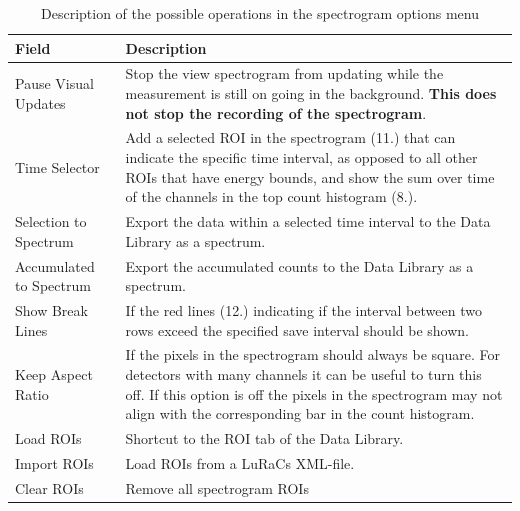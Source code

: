 \begin{table}[H]
    \centering
    \caption{Description of the possible operations in the spectrogram options menu}
    \label{tab:spectrogram_options}
    \begin{tabular}{p{}p{}}
    \toprule
    \textbf{Field} & \textbf{Description} \\ \midrule
    Pause Visual Updates & Stop the view spectrogram from updating while the measurement is still on going in the background. \textbf{This does not stop the recording of the spectrogram}. \\
    Time Selector & Add a selected ROI in the spectrogram (11.) that can indicate the specific time interval, as opposed to all other ROIs that have energy bounds, and show the sum over time of the channels in the top count histogram (8.). \\
    Selection to Spectrum & Export the data within a selected time interval to the Data Library as a spectrum. \\
    Accumulated to Spectrum & Export the accumulated counts to the Data Library as a spectrum. \\
    Show Break Lines & If the red lines (12.) indicating if the interval between two rows exceed the specified save interval should be shown. \\
    Keep Aspect Ratio & If the pixels in the spectrogram should always be square. For detectors with many channels it can be useful to turn this off. If this option is off the pixels in the spectrogram may not align with the corresponding bar in the count histogram. \\
    Load ROIs & Shortcut to the ROI tab of the Data Library. \\
    Import ROIs & Load ROIs from a LuRaCs XML-file. \\
    Clear ROIs & Remove all spectrogram ROIs \\
    \bottomrule
    \end{tabular}
\end{table}